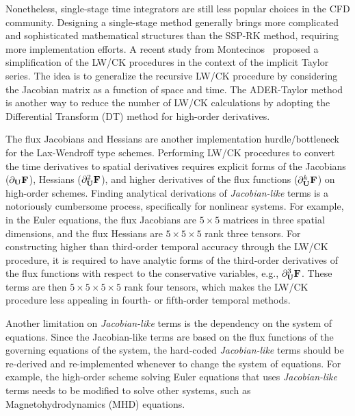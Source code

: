 Nonetheless, single-stage time integrators are still less popular choices in the CFD community.
Designing a single-stage method generally brings more complicated and
sophisticated mathematical structures than the SSP-RK method,
requiring more implementation efforts.
A recent study from Montecinos~\cite{montecinos2020simplified} proposed
a simplification of the LW/CK procedures in the context of the implicit Taylor series.
The idea is to generalize the recursive LW/CK procedure
by considering the Jacobian matrix as a function of space and time.
The ADER-Taylor method~\cite{norman2012multi,norman2013algorithmic,norman2014weno}
is another way to reduce the number of LW/CK calculations
by adopting the Differential Transform (DT) method for high-order derivatives.

The flux Jacobians and Hessians are another implementation hurdle/bottleneck
for the Lax-Wendroff type schemes. Performing LW/CK procedures
to convert the time derivatives to spatial derivatives requires
explicit forms of the Jacobians (\( \partial_{\mathbf{U}} \mathbf{F} \)), Hessians (\( \partial_{\mathbf{U}}^{2} \mathbf{F} \)),
and higher derivatives of the flux functions (\( \partial^{k}_{\mathbf{U}} \mathbf{F} \))
on high-order schemes.
Finding analytical derivations of \textit{Jacobian-like} terms is
a notoriously cumbersome process, specifically for nonlinear systems.
For example, in the Euler equations, the flux Jacobians are \( 5 \times 5 \) matrices
in three spatial dimensions, and the flux Hessians are \( 5 \times 5 \times 5 \) rank three tensors.
For constructing higher than third-order temporal accuracy through the LW/CK procedure,
it is required to have analytic forms of
the third-order derivatives of the flux functions with respect to the conservative variables,
e.g., \( \partial_{\mathbf{U}}^{3} \mathbf{F} \).
These terms are then \( 5 \times 5 \times 5 \times 5 \) rank four tensors,
which makes the LW/CK procedure less appealing in fourth- or fifth-order temporal methods.

Another limitation on \textit{Jacobian-like} terms is the dependency on the system of equations.
Since the Jacobian-like terms are based on the flux functions of
the governing equations of the system, the hard-coded \textit{Jacobian-like} terms
should be re-derived and re-implemented whenever to change the system of equations.
For example, the high-order scheme solving Euler equations that uses \textit{Jacobian-like} terms
needs to be modified to solve other systems, such as Magnetohydrodynamics (MHD) equations.



